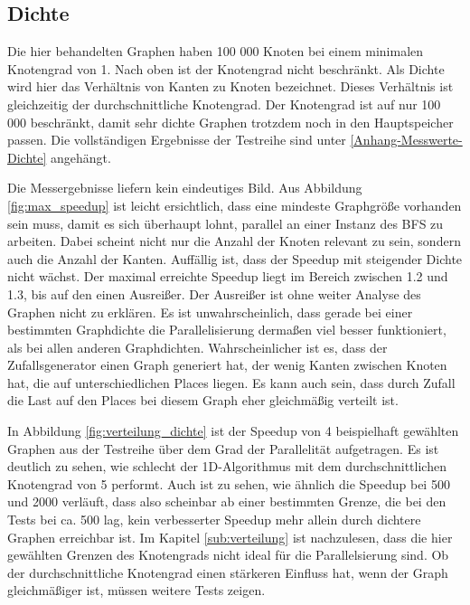\subsection{Dichte} %
\label{sub:dichte}
Die hier behandelten Graphen haben 100 000 Knoten bei einem minimalen Knotengrad von 1. Nach oben ist der Knotengrad nicht beschränkt. Als Dichte wird hier das Verhältnis von Kanten zu Knoten bezeichnet. Dieses Verhältnis ist gleichzeitig der durchschnittliche Knotengrad. Der Knotengrad ist auf nur 100 000 beschränkt, damit sehr dichte Graphen trotzdem noch in den Hauptspeicher passen. Die vollständigen Ergebnisse der Testreihe sind unter \ref{Anhang-Messwerte-Dichte} angehängt.

Die Messergebnisse liefern kein eindeutiges Bild. Aus Abbildung \ref{fig:max_speedup} ist leicht ersichtlich, dass eine mindeste Graphgröße vorhanden sein muss, damit es sich überhaupt lohnt, parallel an einer Instanz des BFS zu arbeiten. Dabei scheint nicht nur die Anzahl der Knoten relevant zu sein, sondern auch die Anzahl der Kanten. Auffällig ist, dass der Speedup mit steigender Dichte nicht wächst. Der maximal erreichte Speedup liegt im Bereich zwischen 1.2 und 1.3, bis auf den einen Ausreißer. Der Ausreißer ist ohne weiter Analyse des Graphen nicht zu erklären. Es ist unwahrscheinlich, dass gerade bei einer bestimmten Graphdichte die Parallelisierung dermaßen viel besser funktioniert, als bei allen anderen Graphdichten. Wahrscheinlicher ist es, dass der Zufallsgenerator einen Graph generiert hat, der wenig Kanten zwischen Knoten hat, die auf unterschiedlichen Places liegen. Es kann auch sein, dass durch Zufall die Last auf den Places bei diesem Graph eher gleichmäßig verteilt ist. 

In Abbildung \ref{fig:verteilung_dichte} ist der Speedup von 4 beispielhaft gewählten Graphen aus der Testreihe über dem Grad der Parallelität aufgetragen. Es ist deutlich zu sehen, wie schlecht der 1D-Algorithmus mit dem durchschnittlichen Knotengrad von 5 performt. Auch ist zu sehen, wie ähnlich die Speedup bei 500 und 2000 verläuft, dass also scheinbar ab einer bestimmten Grenze, die bei den Tests bei ca. 500 lag, kein verbesserter Speedup mehr allein durch dichtere Graphen erreichbar ist. Im Kapitel \ref{sub:verteilung} ist nachzulesen, dass die hier gewählten Grenzen des Knotengrads nicht ideal für die Parallelsierung sind. Ob der durchschnittliche Knotengrad einen stärkeren Einfluss hat, wenn der Graph gleichmäßiger ist, müssen weitere Tests zeigen.


